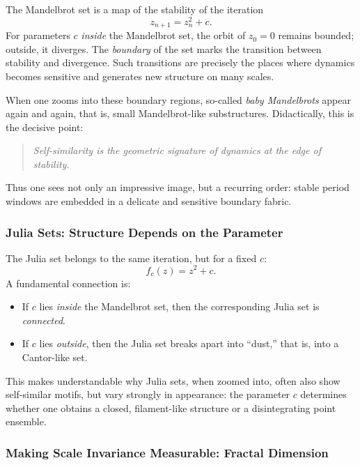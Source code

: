 The Mandelbrot set is a map of the stability of the iteration
\[
z_{n+1}=z_n^2+c.
\]
For parameters \(c\) \emph{inside} the Mandelbrot set,
the orbit of \(z_0=0\) remains bounded;
outside, it diverges.
The \emph{boundary} of the set marks the transition between stability and divergence.
Such transitions are precisely the places
where dynamics becomes sensitive
and generates new structure on many scales.

When one zooms into these boundary regions,
so-called \emph{baby Mandelbrots} appear again and again,
that is, small Mandelbrot-like substructures.
Didactically, this is the decisive point:

\begin{quote}
	\emph{Self-similarity is the geometric signature of dynamics at the edge of stability.}
\end{quote}

Thus one sees not only an impressive image,
but a recurring order:
stable period windows are embedded
in a delicate and sensitive boundary fabric.

\subsubsection*{Julia Sets: Structure Depends on the Parameter}

The Julia set belongs to the same iteration,
but for a fixed \(c\):
\[
f_c(z)=z^2+c.
\]
A fundamental connection is:

\begin{itemize}
	\item If \(c\) lies \emph{inside} the Mandelbrot set, then the corresponding Julia set is \emph{connected}.
	\item If \(c\) lies \emph{outside}, then the Julia set breaks apart into ``dust,'' that is, into a Cantor-like set.
\end{itemize}

This makes understandable
why Julia sets, when zoomed into, often also show self-similar motifs,
but vary strongly in appearance:
the parameter \(c\) determines
whether one obtains a closed, filament-like structure
or a disintegrating point ensemble.

\subsubsection*{Making Scale Invariance Measurable: Fractal Dimension}

